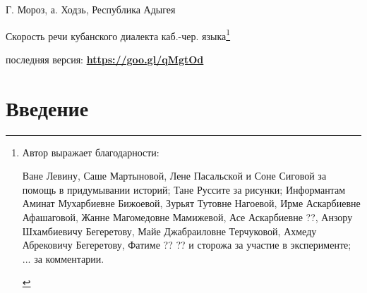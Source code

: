 
\usepackage{alltt}

\begin{flushright}
	{\footnotesize Г. Мороз, а. Ходзь, Республика Адыгея}
\end{flushright}
\begin{center}{\Large Скорость речи кубанского диалекта каб.-чер. языка\footnote{Автор выражает благодарности:
\begin{itemize}
\mytem Ване Левину, Саше Мартыновой, Лене Пасальской и Соне Сиговой за помощь в придумывании историй;
\mytem Тане Руссите за рисунки;
\mytem Информантам Аминат Мухарбиевне Бижоевой, Зурьят Тутовне Нагоевой, Ирме Аскарбиевне Афашаговой, Жанне Магомедовне Мамижевой, Асе Аскарбиевне ??, Анзору Шхамбиевичу Бегеретову, Майе Джабраиловне Терчуковой,  Ахмеду Абрековичу Бегеретову,  Фатиме ?? ?? и сторожа за участие в эксперименте;
\mytem ... за комментарии.
\end{itemize}}}
\end{center}
{\noindent\footnotesize последняя версия: \textbf{\href{https://goo.gl/qMgtOd}{https://goo.gl/qMgtOd}}}
\vfill
\tableofcontents
\pagebreak
\section{Введение}
